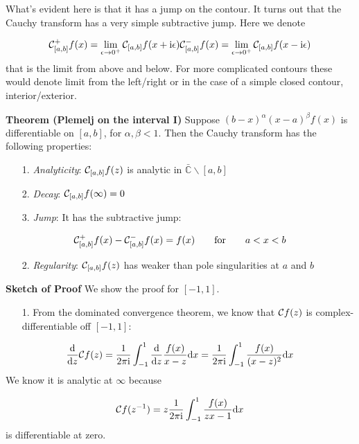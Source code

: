 \documentclass[12pt,a4paper]{article}
\def\qqfor{\qquad\hbox{for}\qquad}
\def\D{ {\rm d} }
\def\I{ {\rm i} }
\def\C{ {\mathbb C} }
\def\CC{ {\cal C} }
\def\dx{\D x}
\begin{document}
What's evident here is that it has a jump on the contour.  It turns out that the Cauchy transform has a very simple subtractive jump. Here we denote

\[
    \CC_{[a,b]}^+ f(x) = \lim_{\epsilon \rightarrow 0^+} \CC_{[a,b]} f( x+ \I \epsilon)\\
        \CC_{[a,b]}^- f(x) = \lim_{\epsilon \rightarrow 0^+} \CC_{[a,b]} f( x- \I \epsilon)
\]
that is the limit from above and below. For more complicated contours these would denote limit from the left/right or in the case of a simple closed contour, interior/exterior. 

\textbf{Theorem (Plemelj on the interval I)} Suppose $(b-x)^\alpha (x-a)^\beta f(x)$ is differentiable  on $[a,b]$, for $\alpha, \beta < 1$.  Then the Cauchy transform has the following properties:

\begin{itemize}
\item[1. ] \emph{Analyticity}: $\CC_{[a,b]} f(z)$ is analytic in $\bar \C \backslash [a,b]$


\item[2. ] \emph{Decay}: $\CC_{[a,b]} f(\infty) = 0$


\item[3. ] \emph{Jump}: It has the subtractive jump:

\end{itemize}
\[
\CC_{[a,b]}^+ f(x) - \CC_{[a,b]}^- f(x) = f(x) \qqfor a < x < b
\]
\begin{itemize}
\item[2. ] \emph{Regularity}: $\CC_{[a,b]} f(z)$ has weaker than pole singularities at $a$ and $b$

\end{itemize}
\textbf{Sketch of Proof}  We show the proof for $[-1,1]$.

\begin{itemize}
\item[1. ] From the dominated convergence theorem, we know that $\CC f(z)$ is complex-differentiable off $[-1,1]$:

\end{itemize}
\[
{\D \over \D z} {\cal C} f(z) = {1 \over 2 \pi \I}\int_{-1}^1  {\D \over \D z} {f(x) \over x - z} \dx = {1 \over 2 \pi \I}\int_{-1}^1   {f(x) \over (x - z)^2} \dx
\]
We know it is analytic at $\infty$ because

\[
{\cal C} f(z^{-1}) = z {1 \over 2 \pi \I}\int_{-1}^1   {f(x) \over z x - 1} \dx
\]
is differentiable at zero. 
\end{document}
